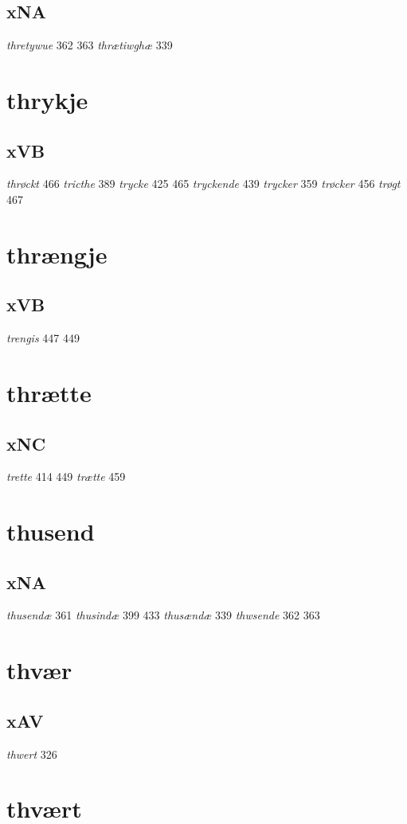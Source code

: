\documentclass[a4paper,twocolumn]{article}
\begin{document}
\subsection{xNA}
\label{sec:org8c53c3f}
\emph{thretywue} 362 363 \emph{thrætiwghæ} 339 
\section{thrykje}
\label{sec:org94385fb}
\subsection{xVB}
\label{sec:org4e1c4e9}
\emph{thrøckt} 466 \emph{tricthe} 389 \emph{trycke} 425 465 \emph{tryckende} 439 \emph{trycker} 359 \emph{trøcker} 456 \emph{trøgt} 467 
\section{thrængje}
\label{sec:org1712a20}
\subsection{xVB}
\label{sec:orgfd77cfb}
\emph{trengis} 447 449 
\section{thrætte}
\label{sec:orgdaab65d}
\subsection{xNC}
\label{sec:org01e1a29}
\emph{trette} 414 449 \emph{trætte} 459 
\section{thusend}
\label{sec:org896a759}
\subsection{xNA}
\label{sec:orgcd9adc2}
\emph{thusendæ} 361 \emph{thusindæ} 399 433 \emph{thusændæ} 339 \emph{thwsende} 362 363 
\section{thvær}
\label{sec:org49ce9ee}
\subsection{xAV}
\label{sec:orgd0c189d}
\emph{thwert} 326 
\section{thvært}
\label{sec:orgd9ae24c}
\end{document}
